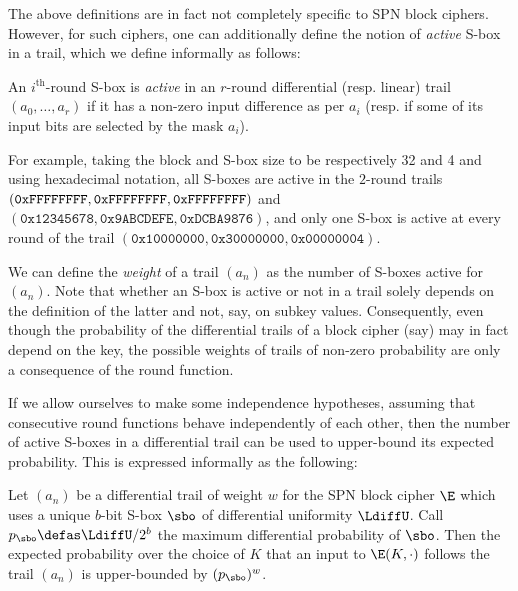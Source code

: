 \medskip

The above definitions are in fact not completely specific to SPN block ciphers. However, for such ciphers, one can additionally
define the notion of \emph{active} S-box in a trail, which we define informally as follows:

\begin{defi}
An $i^\text{th}$-round S-box is \emph{active} in an $r$-round differential (resp. linear) trail $(a_0,\ldots,a_r)$
if it has a non-zero input difference as per $a_i$ (resp. if some of its input bits are selected
by the mask $a_i$).
\end{defi}

\noindent
For example, taking the block and S-box size to be respectively 32 and 4 and using hexadecimal notation, all S-boxes are active in the
$2$-round trails $(\texttt{0xFFFFFFFF}, \texttt{0xFFFF}\linebreak{}\texttt{FFFF}, \texttt{0xFFFFFFFF})$ and
$(\texttt{0x12345678}, \texttt{0x9ABCDEFE}, \texttt{0xDCBA9876})$, and only one S-box is active at every round of the trail $(\texttt{0x10000000},
\texttt{0x30000000}, \texttt{0x00000004})$.

We can define the \emph{weight} of a trail $(a_n)$ as the number of S-boxes active for $(a_n)$. Note that whether
an S-box is active or not in a trail solely depends on the definition of the latter and not, say, on subkey values.
Consequently, even though the probability of the differential trails of a block cipher (say) may in fact depend on the key, the possible weights of
trails of non-zero probability are only a consequence of the round function.

If we allow ourselves to make some independence hypotheses, assuming that consecutive round functions
behave independently of each other, then the number of active S-boxes in a differential trail can be used to upper-bound its expected probability.
This is expressed informally as the following:

\begin{assu}
\label{assu:mark}
Let $(a_n)$ be a differential trail of weight $w$ for the SPN block cipher $\E$ which uses a unique $b$-bit S-box $\sbo$ of differential uniformity
$\LdiffU$. Call $p_{\sbo} \defas \LdiffU/2^b$ the maximum differential probability of $\sbo$.
Then the expected probability over the choice of $K$ that an input to $\E(K,\cdot)$ follows the trail $(a_n)$ is upper-bounded by $(p_{\sbo})^w$.
\end{assu}

